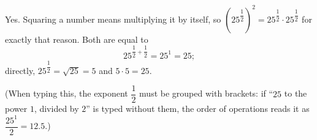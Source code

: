 Yes. Squaring a number means multiplying it by itself, so $\left(25^{\dfrac{1}{2}}\right)^2=25^{\dfrac{1}{2}}\cdot25^{\dfrac{1}{2}}$ for exactly that reason. Both are equal to
\[25^{\dfrac{1}{2}+\dfrac{1}{2}}=25^1=\boxed{25};\]
directly, $25^{\dfrac{1}{2}}=\sqrt{25}=5$ and $5\cdot5=25$.

(When typing this, the exponent $\dfrac{1}{2}$ must be grouped with brackets: if ``$25$ to the power $1$, divided by $2$'' is typed without them, the order of operations reads it as $\dfrac{25^1}{2}=12.5$.)
